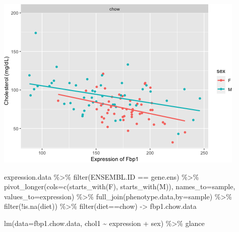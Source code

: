 \documentclass[
]{article}
\newenvironment{Shaded}{\begin{snugshade}}{\end{snugshade}}
\newcommand{\AttributeTok}[1]{\textcolor[rgb]{0.77,0.63,0.00}{#1}}
\newcommand{\FunctionTok}[1]{\textcolor[rgb]{0.00,0.00,0.00}{#1}}
\newcommand{\NormalTok}[1]{#1}
\newcommand{\OtherTok}[1]{\textcolor[rgb]{0.56,0.35,0.01}{#1}}
\newcommand{\SpecialCharTok}[1]{\textcolor[rgb]{0.00,0.00,0.00}{#1}}
\newcommand{\StringTok}[1]{\textcolor[rgb]{0.31,0.60,0.02}{#1}}
\begin{document}
\includegraphics{figures/Fbp1-associations-2.png}

\begin{Shaded}
\begin{Highlighting}[]
\NormalTok{expression.data }\SpecialCharTok{\%\textgreater{}\%}
  \FunctionTok{filter}\NormalTok{(ENSEMBL.ID }\SpecialCharTok{==}\NormalTok{ gene.ens) }\SpecialCharTok{\%\textgreater{}\%}
  \FunctionTok{pivot\_longer}\NormalTok{(}\AttributeTok{cols=}\FunctionTok{c}\NormalTok{(}\FunctionTok{starts\_with}\NormalTok{(}\StringTok{\textquotesingle{}F\textquotesingle{}}\NormalTok{),}
                      \FunctionTok{starts\_with}\NormalTok{(}\StringTok{\textquotesingle{}M\textquotesingle{}}\NormalTok{)),}
               \AttributeTok{names\_to=}\StringTok{\textquotesingle{}sample\textquotesingle{}}\NormalTok{,}
               \AttributeTok{values\_to=}\StringTok{\textquotesingle{}expression\textquotesingle{}}\NormalTok{) }\SpecialCharTok{\%\textgreater{}\%}
  \FunctionTok{full\_join}\NormalTok{(phenotype.data,}\AttributeTok{by=}\StringTok{\textquotesingle{}sample\textquotesingle{}}\NormalTok{) }\SpecialCharTok{\%\textgreater{}\%}
  \FunctionTok{filter}\NormalTok{(}\SpecialCharTok{!}\FunctionTok{is.na}\NormalTok{(diet)) }\SpecialCharTok{\%\textgreater{}\%}
  \FunctionTok{filter}\NormalTok{(diet}\SpecialCharTok{==}\StringTok{\textquotesingle{}chow\textquotesingle{}}\NormalTok{) }\OtherTok{{-}\textgreater{}}\NormalTok{ fbp1.chow.data}

\FunctionTok{lm}\NormalTok{(}\AttributeTok{data=}\NormalTok{fbp1.chow.data, chol1 }\SpecialCharTok{\textasciitilde{}}\NormalTok{ expression }\SpecialCharTok{+}\NormalTok{ sex) }\SpecialCharTok{\%\textgreater{}\%}
\NormalTok{  glance}
\end{Highlighting}
\end{Shaded}
\end{document}
